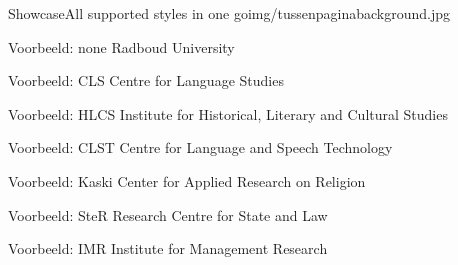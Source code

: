 \documentclass[department=none, notes={show notes}, slidesperpage=4, official=true, handout]{beamerruhuisstijl}
\begin{document}

\begin{tussenpagina}{Showcase}{All supported styles in one go}{img/tussenpaginabackground.jpg}
\end{tussenpagina}
\note{}

\renewcommand{\dept}{none}
\begin{frame}
    \titlepage
\end{frame}
\begin{frame}{Voorbeeld: none}
	Radboud University
\end{frame}

\renewcommand{\dept}{cls}
\begin{frame}
    \titlepage
\end{frame}
\begin{frame}{Voorbeeld: CLS}
	Centre for Language Studies
\end{frame}

\renewcommand{\dept}{hlcs}
\begin{frame}
    \titlepage
\end{frame}
\begin{frame}{Voorbeeld: HLCS}
	Institute for Historical, Literary and Cultural Studies
\end{frame}

\renewcommand{\dept}{clst}
\begin{frame}
    \titlepage
\end{frame}
\begin{frame}{Voorbeeld: CLST}
	Centre for Language and Speech Technology
\end{frame}

\renewcommand{\dept}{kaski}
\begin{frame}
    \titlepage
\end{frame}
\begin{frame}{Voorbeeld: Kaski}
	Center for Applied Research on Religion
\end{frame}

\renewcommand{\dept}{ster}
\begin{frame}
    \titlepage
\end{frame}
\begin{frame}{Voorbeeld: SteR}
	Research Centre for State and Law
\end{frame}

\renewcommand{\dept}{imr}
\begin{frame}
    \titlepage
\end{frame}
\begin{frame}{Voorbeeld: IMR}
	Institute for Management Research
\end{frame}
\end{document}
